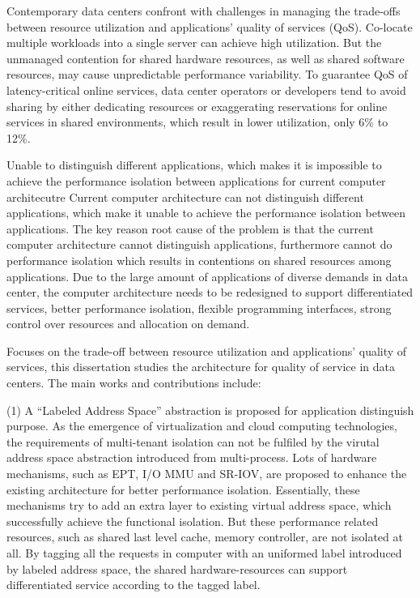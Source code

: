 
\begin{eabstract}
  Contemporary data centers confront with challenges in
  managing the trade-offs between resource utilization and
  applications’ quality of services (QoS). 
  Co-locate multiple workloads into a single server can
  achieve high utilization.
  But the unmanaged contention for shared hardware resources,
  as well as shared software resources,
  may cause unpredictable performance variability.
  To guarantee QoS of latency-critical online services,
  data center operators or developers tend to avoid sharing by
  either dedicating resources or exaggerating reservations
  for online services in shared environments,
  which result in lower utilization, only 6\% to 12\%.

  Unable to distinguish different applications,
  which makes it is impossible to achieve the performance isolation between applications for
  current computer architecutre 
  Current computer architecture can not distinguish different applications,
  which make it unable to achieve the performance isolation between applications.
  The key reason root cause of the problem is that the current computer architecture 
  cannot distinguish applications, furthermore cannot do performance isolation 
  which results in contentions on shared resources among applications. 
  Due to the large amount of applications of diverse demands 
  in data center, the computer architecture needs to be redesigned 
  to support differentiated services, better performance isolation, 
  flexible programming interfaces, strong control over resources and allocation on demand.
  
  Focuses on the trade-off between resource utilization and applications'
  quality of services, this dissertation studies the architecture for quality of service
  in data centers. The main works and contributions include:

  (1) A ``Labeled Address Space'' abstraction is proposed
      for application distinguish purpose.
      As the emergence of virtualization and cloud computing technologies,
      the requirements of multi-tenant isolation can not be fulfiled by the virutal
      address space abstraction introduced from multi-process.
      Lots of hardware mechanisms, such as EPT, I/O MMU and SR-IOV,
      are proposed to enhance the existing architecture for better performance isolation.
      Essentially, these mechanisms try to add an extra layer to existing virtual address
      space, which successfully achieve the functional isolation.
      But these performance related resources,
      such as shared last level cache, memory controller,
      are not isolated at all.
      By tagging all the requests in computer with an uniformed label introduced by
      labeled address space, the shared hardware-resources can support
      differentiated service according to the tagged label.


\end{eabstract}
